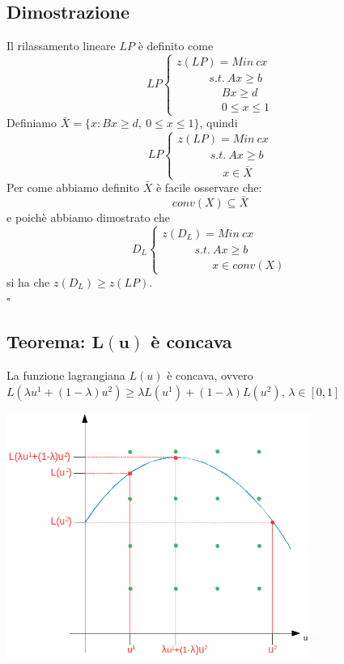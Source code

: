 \subsection{Dimostrazione}
Il rilassamento lineare $LP$ è definito come
\begin{equation*}
	LP
	\begin{cases}
		z(LP)=Min\ cx \\
		\ \ \ \ \ \ \ \ \ \ \ \ \ s.t.\ Ax\ge b \\
		\ \ \ \ \ \ \ \ \ \ \ \ \ \ \ \ \ \ Bx\ge d \\
		\ \ \ \ \ \ \ \ \ \ \ \ \ \ \ \ \ \ 0\le x\le 1
	\end{cases}
\end{equation*}
Definiamo $\bar{X}=\{x:Bx\ge d,\ 0\le x\le 1\}$, quindi
\begin{equation*}
	LP
	\begin{cases}
		z(LP)=Min\ cx \\
		\ \ \ \ \ \ \ \ \ \ \ \ \ s.t.\ Ax\ge b\\
		\ \ \ \ \ \ \ \ \ \ \ \ \ \ \ \ \ \ x\in\bar{X}
	\end{cases}
\end{equation*}
Per come abbiamo definito $\bar{X}$ è facile osservare che:
\begin{equation*}
	conv(X)\subseteq\bar{X}
\end{equation*}
e poichè abbiamo dimostrato che
\begin{equation*}
	D_{L}
	\begin{cases}
		z(D_{L})=Min\ cx\\
		\ \ \ \ \ \ \ \ \ \ \ \ \ s.t.\ Ax\ge b \\
		\ \ \ \ \ \ \ \ \ \ \ \ \ \ \ \ \ \ \ \ x\in conv(X)
	\end{cases}
\end{equation*}
si ha che $z(D_{L})\ge z(LP)$.\\
$\square$

\clearpage
\subsection{Teorema: $\boldsymbol{L(u)}$ è concava}
La funzione lagrangiana $L(u)$ è concava, ovvero $L(\lambda u^{1}+(1-\lambda)u^{2})\ge \lambda L(u^{1})+(1-\lambda)L(u^{2})$, $\lambda \in [0,1]$

\centerline{\includegraphics[height=8cm]{images/graph28.png}}

